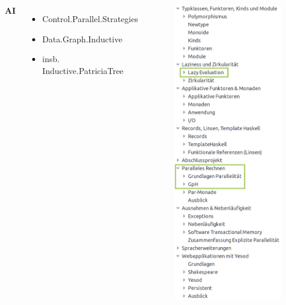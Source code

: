 \documentclass{beamer}
\begin{document}
\begin{frame}

\begin{columns}

{\Large \textbf{AI}}

\begin{itemize}
    \item Control.Parallel.Strategies
    \item Data.Graph.Inductive
    \item insb. Inductive.PatriciaTree

\end{itemize}

\begin{figure}
\includegraphics[height=0.9\paperheight]{cont/ssai.png}
\end{figure}


\end{columns}
\end{frame}
\end{document}
